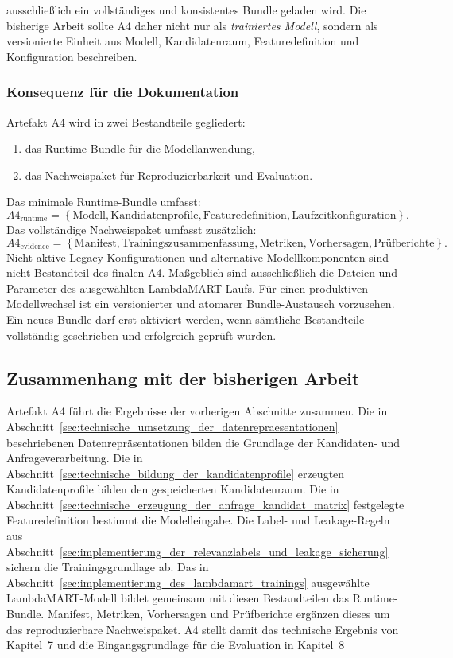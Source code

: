 ausschließlich ein vollständiges und konsistentes Bundle geladen wird. Die bisherige Arbeit sollte A4 daher nicht nur als \textit{trainiertes Modell}, sondern als versionierte Einheit aus Modell, Kandidatenraum, Featuredefinition und Konfiguration beschreiben. \subsubsection*{Konsequenz für die Dokumentation} Artefakt A4 wird in zwei Bestandteile gegliedert: \begin{enumerate} \item das Runtime-Bundle für die Modellanwendung, \item das Nachweispaket für Reproduzierbarkeit und Evaluation. \end{enumerate} Das minimale Runtime-Bundle umfasst: \begin{equation} A4_{\mathrm{runtime}} = \left\{ \text{Modell}, \text{Kandidatenprofile}, \text{Featuredefinition}, \text{Laufzeitkonfiguration} \right\}. \label{eq:a4_runtime} \end{equation} Das vollständige Nachweispaket umfasst zusätzlich: \begin{equation} A4_{\mathrm{evidence}} = \left\{ \text{Manifest}, \text{Trainingszusammenfassung}, \text{Metriken}, \text{Vorhersagen}, \text{Prüfberichte} \right\}. \label{eq:a4_evidence} \end{equation} Nicht aktive Legacy-Konfigurationen und alternative Modellkomponenten sind nicht Bestandteil des finalen A4. Maßgeblich sind ausschließlich die Dateien und Parameter des ausgewählten LambdaMART-Laufs. Für einen produktiven Modellwechsel ist ein versionierter und atomarer Bundle-Austausch vorzusehen. Ein neues Bundle darf erst aktiviert werden, wenn sämtliche Bestandteile vollständig geschrieben und erfolgreich geprüft wurden. \subsection{Zusammenhang mit der bisherigen Arbeit} \label{subsec:zusammenhang_artefakt_a4} Artefakt A4 führt die Ergebnisse der vorherigen Abschnitte zusammen. Die in Abschnitt~\ref{sec:technische_umsetzung_der_datenrepraesentationen} beschriebenen Datenrepräsentationen bilden die Grundlage der Kandidaten- und Anfrageverarbeitung. Die in Abschnitt~\ref{sec:technische_bildung_der_kandidatenprofile} erzeugten Kandidatenprofile bilden den gespeicherten Kandidatenraum. Die in Abschnitt~\ref{sec:technische_erzeugung_der_anfrage_kandidat_matrix} festgelegte Featuredefinition bestimmt die Modelleingabe. Die Label- und Leakage-Regeln aus Abschnitt~\ref{sec:implementierung_der_relevanzlabels_und_leakage_sicherung} sichern die Trainingsgrundlage ab. Das in Abschnitt~\ref{sec:implementierung_des_lambdamart_trainings} ausgewählte LambdaMART-Modell bildet gemeinsam mit diesen Bestandteilen das Runtime-Bundle. Manifest, Metriken, Vorhersagen und Prüfberichte ergänzen dieses um das reproduzierbare Nachweispaket. A4 stellt damit das technische Ergebnis von Kapitel~7 und die Eingangsgrundlage für die Evaluation in Kapitel~8 